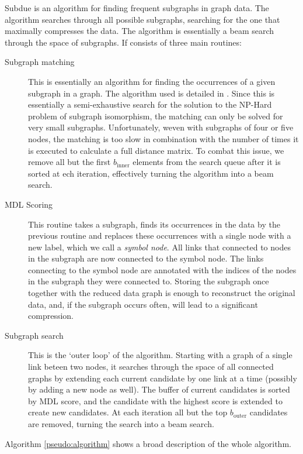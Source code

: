 \documentclass{article}
\begin{document}
Subdue \cite{ketkar2005subdue} is an algorithm for finding frequent subgraphs in graph data. The algorithm searches through all possible subgraphs, searching for the  one that maximally compresses the data. The algorithm is essentially a beam search through the space of subgraphs. If consists of three main routines:

\begin{description}
\item[Subgraph matching] This is essentially an algorithm for finding the occurrences of a given subgraph in a graph. The algorithm used is detailed in \cite{bunke1983inexact}. Since this is essentially a semi-exhaustive search for the solution to the NP-Hard problem of subgraph isomorphism, the matching can only be solved for very small subgraphs. Unfortunately, weven with subgraphs of four or five nodes, the matching is too slow in combination with the number of times it is executed to calculate a full distance matrix. To combat this issue, we remove all but the first $b_{\mbox{inner}}$ elements from the search queue after it is sorted at ech iteration, effectively turning the algorithm into a beam search.
\item[MDL Scoring]
This routine takes a subgraph, finds its occurrences in the data by the previous routine and replaces these occurrences with a single node with a new label, which we call a \emph{symbol node}. All links that connected to nodes in the subgraph are now connected to the symbol node. The links connecting to the symbol node are annotated with the indices of the nodes in the subgraph they were connected to. Storing the subgraph once together with the reduced data graph is enough to reconstruct the original data, and, if the subgraph occurs often, will lead to a significant compression.
\item[Subgraph search]
This is the `outer loop' of the algorithm. Starting with a graph of a single link beteen two nodes, it searches through the space of all connected graphs by extending each current candidate by one link at a time (possibly by adding a new node as well). The buffer of current candidates is sorted by MDL score, and the candidate with the highest score is extended to create new candidates. At each iteration all but the top $b_{\mbox{outer}}$ candidates are removed, turning the search into a beam search.
\end{description}

Algorithm \ref{pseudo:algorithm} shows a broad description of the whole algorithm.
\end{document}
